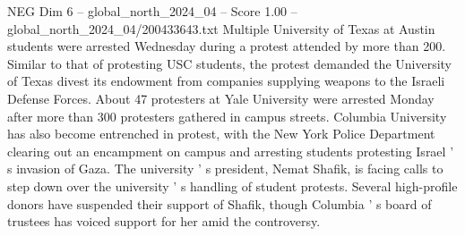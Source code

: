 \begin{textsample}{NEG Dim 6 – global\_north\_2024\_04 – Score 1.00 – global\_north\_2024\_04/200433643.txt}
Multiple University of Texas at Austin students were arrested Wednesday during a protest attended by more than 200.
Similar to that of protesting USC students, the protest demanded the University of Texas divest its endowment from companies supplying weapons to the Israeli Defense Forces.
About 47 protesters at Yale University were arrested Monday after more than 300 protesters gathered in campus streets.
Columbia University has also become entrenched in protest, with the New York Police Department clearing out an encampment on campus and arresting students protesting Israel ' s invasion of Gaza.
The university ' s president, Nemat Shafik, is facing calls to step down over the university ' s handling of student protests.
Several high-profile donors have suspended their support of Shafik, though Columbia ' s board of trustees has voiced support for her amid the controversy.

\end{textsample}
